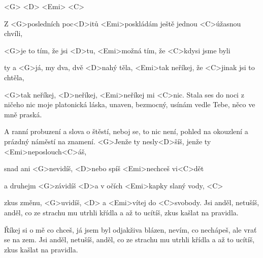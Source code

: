 
<G> <D> <Emi> <C>

\zs
Z <G>posledních poc<D>itů
<Emi>poskládám ještě jednou <C>úžasnou chvíli,

<G>je to tím, že jsi <D>tu,
<Emi>možná tím, že <C>kdysi jsme byli

ty a <G>já, my dva, dvě <D>nahý těla,
<Emi>tak neříkej, že <C>jinak jsi to chtěla,

<G>tak neříkej,
<D>neříkej, <Emi>neříkej mi <C>nic.
\ks
\zs
Stala ses do noci
z ničeho nic moje platonická láska,
unaven, bezmocný,
usínám vedle Tebe, něco ve mně praská.

A ranní probuzení
a slova o štěstí, neboj se, to nic není,
pohled na okouzlení
a prázdný náměstí na znamení.
\ks
\zr
<G>Jenže ty nesly<D>šíš,
jenže ty <Emi>neposlouch<C>áš,

snad ani <G>nevidíš,
<D>nebo spíš <Emi>nechceš vi<C>dět

a druhejm <G>závidíš
<D>a v očích <Emi>kapky slaný vody, <C>

zkus změnu, <G>uvidíš, <D>
a <Emi>vítej do <C>svobody.
\kr
\zs
Jsi anděl, netušíš,
anděl, co ze strachu mu utrhli křídla
a až to ucítíš, zkus kašlat na pravidla.

Říkej si o mě co chceš,
já jsem byl odjakživa blázen,
nevím, co nechápeš,
ale vrať se na zem.
\ks
\zr \kr
\zs
Jsi anděl, netušíš,
anděl, co ze strachu mu utrhli křídla
a až to ucítíš, zkus kašlat na pravidla.
\ks
\zr \kr

\kp
